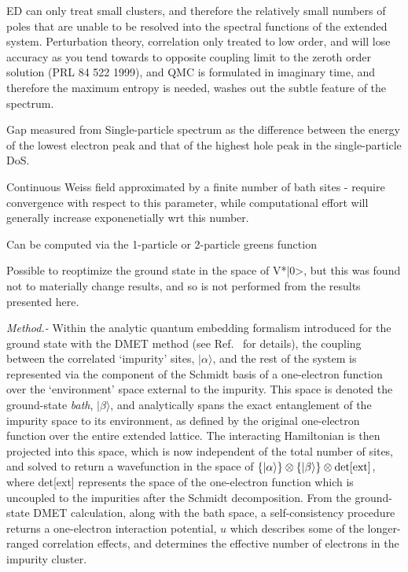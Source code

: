 \documentclass[aps,showpacs,twocolumn,nobibnotes]{revtex4}
\begin{document}
ED can only treat small clusters, and therefore the relatively small numbers of poles that are unable to be resolved into the spectral functions of the extended system. Perturbation theory, 
correlation only treated to low order, and will 
lose accuracy as you tend towards to opposite coupling limit to the zeroth order solution (PRL 84 522 1999), and QMC is formulated in imaginary time, and therefore the maximum entropy is needed,
washes out the subtle feature of the spectrum.


Gap measured from Single-particle spectrum as the difference between the energy of the lowest electron peak and that of the highest hole peak in the single-particle DoS.

Continuous Weiss field approximated by a finite number of bath sites - require convergence with respect to this parameter, while computational effort will generally increase exponenetially wrt this number.

Can be computed via the 1-particle or 2-particle greens function

Possible to reoptimize the ground state in the space of V*|0>, but this was found not to materially change results, and so is not performed from the results presented here.


\emph{Method.-} Within the analytic quantum embedding formalism introduced for the ground state with the DMET method (see Ref.~ for details), the coupling between the 
correlated `impurity' sites, $|\alpha \rangle$, and the rest of the
system is represented via the component of the Schmidt basis of a one-electron function over the `environment' space external to the impurity. This space is denoted the 
ground-state {\em bath}, $|\beta \rangle$, and analytically spans the exact entanglement of the impurity space to its environment, as defined by the original one-electron function
over the entire extended lattice. The interacting Hamiltonian is then projected into this space, which is now independent of the total number of sites, and solved to return a wavefunction 
in the space of $\{ |\alpha \rangle \} \otimes \{ |\beta \rangle \} \otimes \rm{det[ext]}$, where det[ext] represents the space of the one-electron function which is uncoupled to the impurities
after the Schmidt decomposition. From the ground-state DMET calculation, along with the bath space, a self-consistency procedure returns a one-electron interaction potential, $u$ which
describes some of the longer-ranged correlation effects, and determines the effective number of electrons in the impurity cluster.
\end{document}
